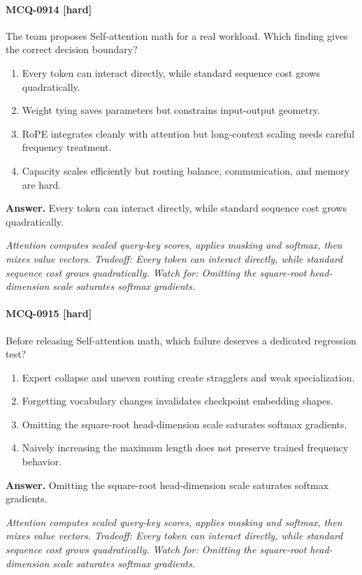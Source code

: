 \paragraph{MCQ-0914 [hard]} The team proposes Self-attention math for a real workload. Which finding gives the correct decision boundary?
\begin{enumerate}[label=\Alph*.]
\item Every token can interact directly, while standard sequence cost grows quadratically.
\item Weight tying saves parameters but constrains input-output geometry.
\item RoPE integrates cleanly with attention but long-context scaling needs careful frequency treatment.
\item Capacity scales efficiently but routing balance, communication, and memory are hard.
\end{enumerate}
\noindent\textbf{Answer.} Every token can interact directly, while standard sequence cost grows quadratically.
\par\textit{Attention computes scaled query-key scores, applies masking and softmax, then mixes value vectors. Tradeoff: Every token can interact directly, while standard sequence cost grows quadratically. Watch for: Omitting the square-root head-dimension scale saturates softmax gradients.}
\paragraph{MCQ-0915 [hard]} Before releasing Self-attention math, which failure deserves a dedicated regression test?
\begin{enumerate}[label=\Alph*.]
\item Expert collapse and uneven routing create stragglers and weak specialization.
\item Forgetting vocabulary changes invalidates checkpoint embedding shapes.
\item Omitting the square-root head-dimension scale saturates softmax gradients.
\item Naively increasing the maximum length does not preserve trained frequency behavior.
\end{enumerate}
\noindent\textbf{Answer.} Omitting the square-root head-dimension scale saturates softmax gradients.
\par\textit{Attention computes scaled query-key scores, applies masking and softmax, then mixes value vectors. Tradeoff: Every token can interact directly, while standard sequence cost grows quadratically. Watch for: Omitting the square-root head-dimension scale saturates softmax gradients.}
